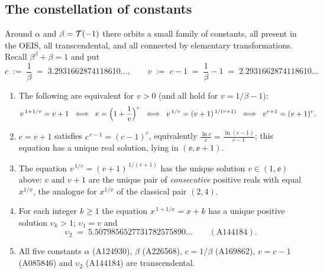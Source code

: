 \subsection{The constellation of constants}\label{subsec:network}

Around $\alpha$ and $\beta = \mathcal{T}(-1)$ there orbits a small family of
constants, all present in the OEIS, all transcendental, and all
connected by elementary transformations. Recall
$\beta^{\beta} + \beta = 1$ and put
\[
    c \;:=\; \frac{1}{\beta} \;=\; 3.2931662874118610\ldots,
    \qquad
    v \;:=\; c - 1 \;=\; \frac{1}{\beta} - 1 \;=\;
    2.2931662874118610\ldots
\]

\begin{theorem}\label{thm:network}
\begin{enumerate}[label=\textup{(\roman*)}, leftmargin=2.4em]
\item The following are equivalent for $v > 0$ (and all hold for
$v = 1/\beta - 1$):
\[
    v^{\,1+1/v} = v + 1
    \;\iff\; v = \Bigl(1+\frac1v\Bigr)^{v}
    \;\iff\; v^{\,1/v} = (v+1)^{\,1/(v+1)}
    \;\iff\; v^{v+1} = (v+1)^{v} .
\]
\item $c = v + 1$ satisfies $c^{\,c-1} = (c-1)^{c}$, equivalently
$\frac{\ln c}{c} = \frac{\ln(c-1)}{c-1}$; this equation has a unique
real solution, lying in $(\ee, \ee+1)$.
\item The equation $v^{\,1/v} = (v+1)^{\,1/(v+1)}$ has the unique
solution $v \in (1, \ee)$ above: $v$ and $v+1$ are the unique pair of
\emph{consecutive} positive reals with equal $x^{1/x}$, the analogue
for $x^{1/x}$ of the classical pair $(2,4)$.
\item For each integer $k \ge 1$ the equation
$x^{\,1+1/x} = x + k$ has a unique positive solution
$\upsilon_k > 1$; $\upsilon_1 = v$ and
\[
    \upsilon_2 \;=\; 5.5079856527731782575890\ldots
    \qquad (\textrm{A144184}) .
\]
\item All five constants $\alpha$ (A124930), $\beta$ (A226568),
$c = 1/\beta$ (A169862), $v = c - 1$ (A085846) and $\upsilon_2$
(A144184) are transcendental.
\end{enumerate}
\end{theorem}

